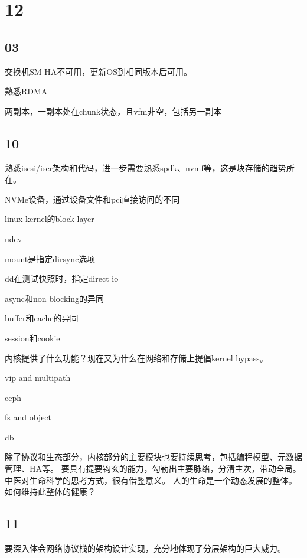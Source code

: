 \section{12}

\subsection{03}

交换机SM HA不可用，更新OS到相同版本后可用。

熟悉RDMA

两副本，一副本处在chunk状态，且vfm非空，包括另一副本

\subsection{10}

熟悉iscsi/iser架构和代码，进一步需要熟悉spdk、nvmf等，这是块存储的趋势所在。

\begin{enumbox}
\item NVMe设备，通过设备文件和pci直接访问的不同
\item linux kernel的block layer
\item udev
\item mount是指定dirsync选项
\item dd在测试快照时，指定direct io
\item async和non blocking的异同
\item buffer和cache的异同
\item session和cookie
\item 内核提供了什么功能？现在又为什么在网络和存储上提倡kernel bypass。
\item vip and multipath
\item ceph
\item fs and object
\item db
\end{enumbox}

除了协议和生态部分，内核部分的主要模块也要持续思考，包括编程模型、元数据管理、HA等。
要具有提要钩玄的能力，勾勒出主要脉络，分清主次，带动全局。中医对生命科学的思考方式，很有借鉴意义。
人的生命是一个动态发展的整体。如何维持此整体的健康？

\subsection{11}

要深入体会网络协议栈的架构设计实现，充分地体现了分层架构的巨大威力。

